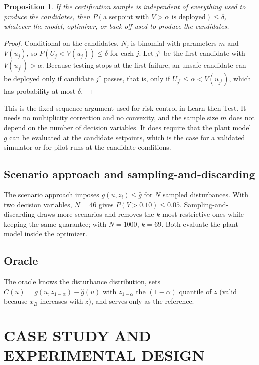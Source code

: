\documentclass[12pt]{article}
\newtheorem{proposition}{Proposition}
\begin{document}
\begin{proposition}
If the certification sample is independent of everything used to produce the candidates, then
$P(\text{a setpoint with } V > \alpha \text{ is deployed}) \le \delta$, whatever the model,
optimizer, or back-off used to produce the candidates.
\end{proposition}

\begin{proof}
Conditional on the candidates, $N_j$ is binomial with parameters $m$ and $V(u_j)$, so
$P(U_j < V(u_j)) \le \delta$ for each $j$. Let $j^\dagger$ be the first candidate with
$V(u_{j^\dagger}) > \alpha$. Because testing stops at the first failure, an unsafe candidate can be
deployed only if candidate $j^\dagger$ passes, that is, only if $U_{j^\dagger} \le \alpha <
V(u_{j^\dagger})$, which has probability at most $\delta$.
\end{proof}

This is the fixed-sequence argument used for risk control in Learn-then-Test.\citep{angelopoulos2021ltt} It needs no multiplicity correction and no convexity, and the sample
size $m$ does not depend on the number of decision variables. It does require that the plant model
$g$ can be evaluated at the candidate setpoints, which is the case for a validated simulator or for
pilot runs at the candidate conditions.

\subsection{Scenario approach and sampling-and-discarding}
The scenario approach imposes $g(u,z_i) \le \bar g$ for $N$ sampled disturbances. With two decision
variables, $N = 46$ gives $P(V > 0.10) \le 0.05$.\citep{calafiore2006,campi2008}
Sampling-and-discarding draws more scenarios and removes the $k$ most restrictive ones while keeping
the same guarantee\citep{campi2011}; with $N=1000$, $k=69$. Both evaluate the plant model inside
the optimizer.

\subsection{Oracle}
The oracle knows the disturbance distribution, sets $C(u) = g(u, z_{1-\alpha}) - \hat g(u)$ with
$z_{1-\alpha}$ the $(1-\alpha)$ quantile of $z$ (valid because $x_B$ increases with $z$), and serves
only as the reference.

\section{CASE STUDY AND EXPERIMENTAL DESIGN}
\end{document}
